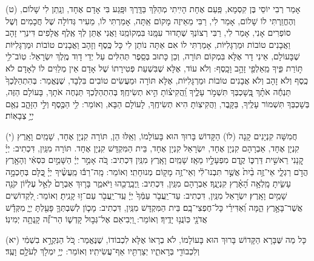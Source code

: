 \documentclass[twoside, openany, parskip=half, 11pt]{book}
\begin{document}
(ט) 
 אָמַר רְבִי יוֹסֵי בֶּן קִסְמָא, פַּֽעַם אֶחָת הָיִֽיתִי מְהַלֵּךְ בַּדָּֽרֶךְ וּפָּֽגַע בִּי אָדָם אֶחָד, וְנָֽתַן לִי שָׁלוֹם, וְהֶחֱזַֽרְתִּי לוֹ שָׁלוֹם, אָמַר לִי, רַבִּי מֵאֵיזֶה מָקוֹם אַֽתָּה, אָמַרְתִּי לוֹ, מֵעִיר גְּדוֹלָה שֶׁל חֲכָמִים וְשֶׁל סוֹפְרִים אָנִי, אָמַר לִי, רַבִּי רְצוֹנְךָ שֶׁתָדוּר עִמָּֽנוּ בִּמְקוֹמֵֽנוּ וַאֲנִי אֶתֵּן לְךָ אֶֽלֶף אֲלָפִים דִּינְרֵי זָהָב וַאֲבָנִים טוֹבוֹת וּמַרְגָּלִיּוֹת, אָמַרְתִּי לוֹ אִם אַתָּה נוֹתֵן לִי כָּל כֶּֽסֶף וְזָהָב וַאֲבָנִים טוֹבוֹת וּמַרְגָּלִיּוֹת שֶׁבָּעוֹלָם, אֵינִי דָר אֶלָּא בִּמְקוֹם תּוֹרָה, וְכֵן כָּתוּב בְּסֵֽפֶר תְּהִלִּים עַל יְדֵי דָוִד מֶֽלֶךְ יִשְׂרָאֵל:  טֽוֹב־לִ֥י תּ֣וֹרַת פִּ֑יךָ מֵֽאַלְפֵ֖י זָהָ֣ב וָכָֽסֶף: וְלֹא עוֹד, אֶלָּא שֶׁבִּשְׁעַת פְּטִירָתוֹ שֶׁל אָדָם אֵין מְלַוִּים לוֹ לְאָדָם לֹא כֶֽסֶף וְלֹא זָהָב וְלֹא אֲבָנִים טוֹבוֹת וּמַרְגָּלִיּוֹת, אֶלָּא תּוֹרָה וּמַעֲשִׂים טוֹבִים בִּלְבָד, שֶׁנֶּאֱמַר:  בְּהִתְהַלֶּכְךָ֙   תַּנְחֶ֬ה אֹתָ֗ךְ בְּֽ֭שָׁכְבְּךָ תִּשְׁמֹ֣ר עָלֶ֑יךָ וַֽ֝הֲקִיצ֗וֹתָ הִ֣יא תְשִׂיחֶֽךָ׃ בְּהִתְהַלֶּכְךָ תַּנְחֶה אֹתָךְ, בָּעוֹלָם הַזֶּה, בְּשָׁכְבְּךָ תִּשְׁמוֹר עָלֶֽיךָ, בַּקָּֽבֶר, וַהֲקִיצֽוֹתָ הִיא תְשִׂיחֶֽךָ, לָעוֹלָם הַבָּא, וְאוֹמֵר:  לִ֥י הַכֶּ֖סֶף וְלִ֣י הַזָּהָ֑ב נְאֻ֖ם יְיָ֥ צְבָאֽוֹת׃

(י)
חֲמִשָּׁה קִנְיָנִים קָנָה (לוֹ) הַקָּדוֹשׁ בָּרוּךְ הוּא בָּעוֹלָמוֹ, וְאֵֽלּוּ הֵן, תּוֹרָה קִנְיָן אֶחָד, שָׁמַֽיִם וָאָֽרֶץ קִנְיָן אֶחָד, אַבְרָהָם קִנְיָן אֶחָד, יִשְׂרָאֵל קִנְיָן אֶחָד, בֵּית הַמִּקְדָּשׁ קִנְיָן אֶחָד. תּוֹרָה מִנַּֽיִן, דִּכְתִיב:  יְיָ֗ קָ֭נָנִי רֵאשִׁ֣ית דַּרְכּ֑וֹ קֶ֖דֶם מִפְעָלָ֣יו מֵאָֽז׃ שָׁמַֽיִם וָאָֽרֶץ מִנַּֽיִן דִּכְתִיב:  כֹּ֚ה אָמַ֣ר יְיָ֔ הַשָּׁמַ֣יִם כִּסְאִ֔י וְהָאָ֖רֶץ הֲדֹ֣ם רַגְלָ֑י אֵי־זֶ֥ה בַ֨יִת֙ אֲשֶׁ֣ר תִּבְנוּ־לִ֔י וְאֵי־זֶ֥ה מָק֖וֹם מְנוּחָתִֽי׃ וְאוֹמֵר:  מָֽה־רַבּ֬וּ מַֽעֲשֶׂ֨יךָ   יְיָ֗ כֻּ֭לָּם בְּחָכְמָ֣ה עָשִׂ֑יתָ מָֽלְאָ֥ה הָ֝אָ֗רֶץ קִנְיָנֶֽךָ׃ אַבְרָהָם מִנַּֽיִן, דִּכְתִיב:  וַֽיְבָֽרֲכֵ֖הוּ וַיֹּאמַ֑ר בָּר֤וּךְ אַבְרָם֙ לְאֵ֣ל עֶלְי֔וֹן קֹנֵ֖ה שָׁמַ֥יִם וָאָֽרֶץ׃ יִשְׂרָאֵל מִנַּֽיִן, דִּכְתִיב:  עַד־יַֽעֲבֹ֤ר עַמְּֿךָ֙ יְיָ֔ עַֽד־יַֽעֲבֹ֖ר עַם־ז֥וּ קָנִֽיתָ׃ וְאוֹמֵר:  לִ֭קְדוֹשִׁים אֲשֶׁר־בָּאָ֣רֶץ הֵ֑מָּה וְ֝אַדִּירֵ֗י כָּל־חֶפְצִי־בָֽם׃ בֵּית הַמִּקְדָּשׁ מִנַּֽיִן, דִּכְתִיב:  מָכ֧וֹן לְשִׁבְתְּךָ֛ פָּעַ֖לְתָּ יְיָ֑ מִקְּדָ֕שׁ אֲדֹנָ֖י כּֽוֹנֲנ֥וּ יָדֶֽיךָ׃ וְאוֹמֵר:  וַ֭יְבִיאֵם אֶל־גְּב֣וּל קָדְשׁ֑וֹ הַר־זֶ֝֗ה קָֽנְתָ֥ה יְמִינֽוֹ׃

(יא)
 כָּל מַה שֶּׁבָּרָא הַקָּדוֹשׁ בָּרוּךְ הוּא בָּעוֹלָמוֹ, לֹא בְרָאוֹ אֶלָּא לִכְבוֹדוֹ, שֶׁנֶּאֱמַר:  כֹּ֚ל הַנִּקְרָ֣א בִשְׁמִ֔י וְלִכְבוֹדִ֖י בְּרָאתִ֑יו יְצַרְתִּ֖יו אַף־עֲשִׂיתִֽיו׃ וְאוֹמֵר:  יְיָ֥  יִמְלֹ֖ךְ לְעֹלָ֥ם וָעֶֽד׃
\end{document}
